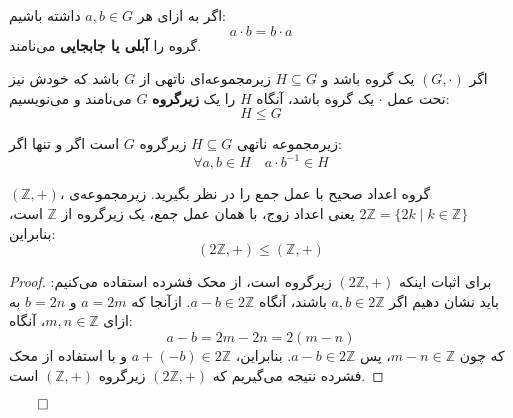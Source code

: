 \begin{frame}
    \begin{definition}
        اگر به ازای هر \( a, b \in G \) داشته باشیم:
        \[
            a \cdot b = b \cdot a
        \]
        گروه را \textbf{آبلی یا جابجایی} می‌نامند.
    \end{definition}


    \begin{definition}[  زیرگروه]
        اگر \( (G, \cdot) \) یک گروه باشد و \( H \subseteq G \) زیرمجموعه‌ای ناتهی از \( G \) باشد که خودش نیز تحت عمل \(\cdot\) یک گروه باشد، آنگاه \( H \) را یک \textbf{زیرگروه} \( G \) می‌نامند و می‌نویسیم:
        \[
            H \leq G
        \]

    \end{definition}
\end{frame}

\begin{frame}
    \begin{theorem}

        زیرمجموعه ناتهی \( H \subseteq G \) زیرگروه \( G \) است اگر و تنها اگر:
        \[
            \forall a, b \in H \quad a \cdot b^{-1} \in H
        \]
    \end{theorem}
    \begin{example}
        \( (\mathbb{Z}, +) \)، گروه اعداد صحیح با عمل جمع را در نظر بگیرید.
        زیرمجموعه‌ی \( 2\mathbb{Z} = \{ 2k \mid k \in \mathbb{Z} \} \) یعنی اعداد زوج، با همان عمل جمع، یک زیرگروه از \( \mathbb{Z} \) است، بنابراین:
        \[
            (2\mathbb{Z}, +) \leq (\mathbb{Z}, +)
        \]
    \end{example}

    \begin{proof}
        برای اثبات اینکه \( (2\mathbb{Z}, +) \) زیرگروه است، از محک فشرده استفاده می‌کنیم:
        باید نشان دهیم اگر \( a, b \in 2\mathbb{Z} \) باشند، آنگاه \( a - b \in 2\mathbb{Z} \).
        ازآنجا که \( a = 2m \) و \( b = 2n \)  به ازای \( m, n \in \mathbb{Z} \)، آنگاه:
        \[
            a - b = 2m - 2n = 2(m - n)
        \]
        که چون \( m - n \in \mathbb{Z} \)، پس \( a - b \in 2\mathbb{Z} \).
        بنابراین، \( a + (-b) \in 2\mathbb{Z} \) و با استفاده از محک فشرده نتیجه می‌گیریم که \( (2\mathbb{Z}, +) \) زیرگروه \( (\mathbb{Z}, +) \) است.
    \end{proof}
    \hfill
    \(\qed\)
\end{frame}



